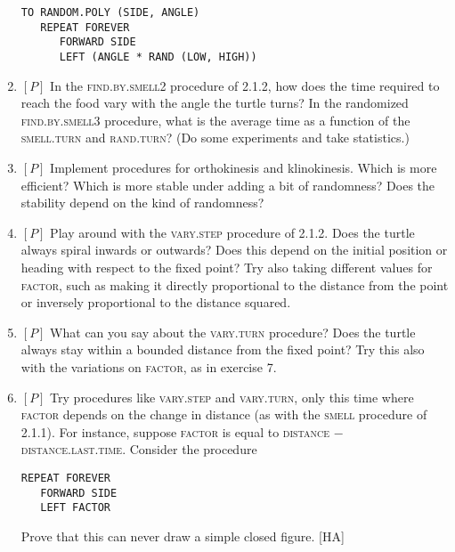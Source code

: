 \documentclass{book}
\begin{document}
\begin{enumerate}
\begin{verbatim}
TO RANDOM.POLY (SIDE, ANGLE)
   REPEAT FOREVER
      FORWARD SIDE
      LEFT (ANGLE * RAND (LOW, HIGH))
\end{verbatim}
\item $[P]$ In the \textsc{find.by.smell2} procedure of 2.1.2, how does the time
required to reach the food vary with the angle the turtle turns? In the
randomized \textsc{find.by.smell3} procedure, what is the average time as a
function of the \textsc{smell.turn} and \textsc{rand.turn}? (Do some experiments and
take statistics.)
\item $[P]$ Implement procedures for orthokinesis and klinokinesis. Which is
more efficient? Which is more stable under adding a bit of randomness?
Does the stability depend on the kind of randomness?
\item $[P]$ Play around with the \textsc{vary.step} procedure of 2.1.2. Does the
turtle always spiral inwards or outwards? Does this depend on the initial
position or heading with respect to the fixed point? Try also taking
different values for \textsc{factor}, such as making it directly proportional to
the distance from the point or inversely proportional to the distance
squared.
\item $[P]$ What can you say about the \textsc{vary.turn} procedure? Does the
turtle always stay within a bounded distance from the fixed point? Try
this also with the variations on \textsc{factor}, as in exercise 7.
\item $[P]$ Try procedures like \textsc{vary.step} and \textsc{vary.turn}, only this time
where \textsc{factor} depends on the change in distance (as with the \textsc{smell}
procedure of 2.1.1). For instance, suppose \textsc{factor} is equal to \textsc{distance} $-$
\textsc{distance.last.time}. Consider the procedure

\begin{verbatim}
REPEAT FOREVER
   FORWARD SIDE
   LEFT FACTOR
\end{verbatim}
\noindent Prove that this can never draw a simple closed figure. [HA]


\end{enumerate}
\end{document}
